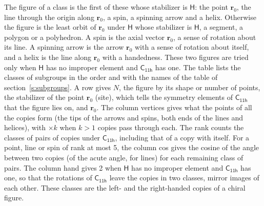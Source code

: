 \documentclass[10pt,a4paper]{article}
\numberwithin{equation}{section}
\newcommand{\grp}[1]{\mathsf{#1}}
\newcommand{\pointr}{\mathbf{r}}
\begin{document}
\leavevmode\label{n:head.figure}The figure of a class is the first of these whose stabilizer is $\grp{H}$: the point $\pointr_0$, the line through the origin along $\pointr_0$, a spin, a spinning arrow and a helix. Otherwise the figure is the least orbit of $\pointr_0$ under $\grp{H}$ whose stabilizer is $\grp{H}$, a segment, a polygon or a polyhedron. A spin is the axial vector $\pointr_0$, a sense of rotation about its line. A spinning arrow is the arrow $\pointr_0$ with a sense of rotation about itself, and a helix is the line along $\pointr_0$ with a handedness. These two figures are tried only when $\grp{H}$ has no improper element and $\grp{C_{11h}}$ has one. The table lists the classes of subgroups in the order and with the names of the table of section~\ref{s:subgroups}. \label{n:head.site}A row gives $N$, the figure by its shape or number of points, the stabilizer of the point $\pointr_0$ (site), which tells the symmetry elements of $\grp{C_{11h}}$ that the figure lies on, and $\pointr_0$. \label{n:head.vertices}The column vertices gives what the points of all the copies form (the tips of the arrows and spins, both ends of the lines and helices), with ${\times}k$ when $k > 1$ copies pass through each. \label{n:head.rank}The rank counts the classes of pairs of copies under $\grp{C_{11h}}$, including that of a copy with itself. \label{n:head.cos}For a point, line or spin of rank at most 5, the column cos gives the cosine of the angle between two copies (of the acute angle, for lines) for each remaining class of pairs. \label{n:head.hand}The column hand gives 2 when $\grp{H}$ has no improper element and $\grp{C_{11h}}$ has one, so that the rotations of $\grp{C_{11h}}$ leave the copies in two classes, mirror images of each other. These classes are the left- and the right-handed copies of a chiral figure.
\end{document}
